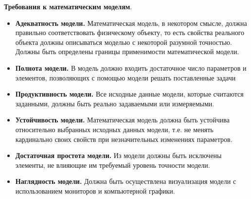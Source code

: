 \documentclass[a4paper, 12pt]{report}
\numberwithin{equation}{section}
\begin{document}
	\textbf{Требования к математическим моделям}.
	\begin{itemize}
		\item \textbf{Адекватность модели.} Математическая модель, в некотором смысле, должна правильно соответствовать физическому объекту, то есть свойства реального объекта должны описываться моделью с некоторой разумной точностью. Должны быть определены границы применимости математической модели.
		\item \textbf{Полнота модели.} В модель должно входить достаточное число параметров и элементов, позволяющих с помощью модели решать поставленные задачи
		\item \textbf{Продуктивность модели.} Все исходные данные модели, которые считаются заданными, должны быть реально задаваемыми или измеряемыми.
		\item \textbf{Устойчивость модели.} Математическая модель должна быть устойчива относительно выбранных исходных данных модели, т.е. не менять кардинально своих свойств при незначительных изменениях параметров.
		\item \textbf{Достаточная простота модели.} Из модели должны быть исключены элементы, не влияющие им требуемый уровень точности модели.
		\item \textbf{Наглядность модели.} Должна быть осуществлена визуализация модели с использованием мониторов и компьютерной графики.
		
	\end{itemize}
	
\end{document}
